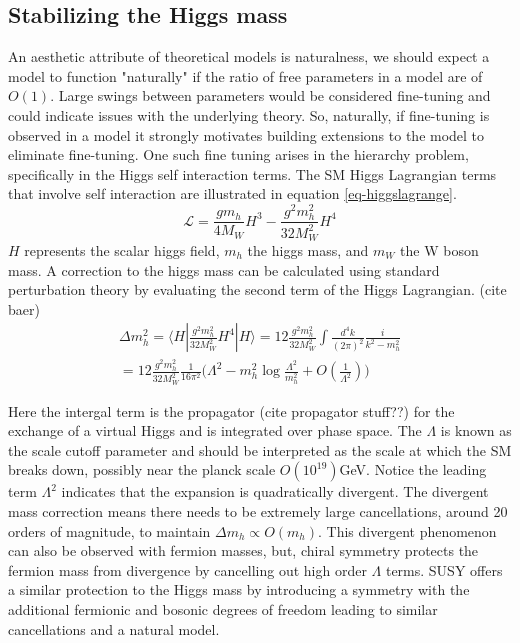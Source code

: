 \subsection{Stabilizing the Higgs mass}

An aesthetic attribute of theoretical models is naturalness, we should expect a model to function "naturally" if the ratio of free parameters in a model are of $O(1)$. Large swings between parameters would be considered fine-tuning and could indicate issues with the underlying theory. So, naturally, if fine-tuning is observed in a model it strongly motivates building extensions to the model to eliminate fine-tuning. %
One such fine tuning arises in the hierarchy problem, specifically in the Higgs self interaction terms. The SM Higgs Lagrangian terms that involve self interaction are illustrated in equation \ref{eq-higgslagrange}.
\begin{equation}
\label{eq-higgslagrange}
\mathcal{L}=\frac{gm_h}{4M_W}H^3 - \frac{g^2m_h^2}{32M_W^2}H^4
\end{equation}
$H$ represents the scalar higgs field, $m_h$ the higgs mass, and $m_W$ the W boson  mass. A correction to the higgs mass can be calculated using standard perturbation theory by evaluating the second term of the Higgs Lagrangian. (cite baer)
\begin{equation}
\begin{split}
\Delta m_h^2 = \langle H | \frac{g^2m_h^2}{32M_W^2} H^4 | H  \rangle = 12\frac{g^2m_h^2}{32M_W^2}\int \frac{d^4 k}{(2\pi)^2} \frac{i}{k^2 - m_h^2}\\
= 12\frac{g^2m_h^2}{32M_W^2} \frac{1}{16\pi^2}\big( \Lambda^2 - m_h^2\log\frac{\Lambda^2}{m_h^2} + O(\frac{1}{\Lambda^2})\big)
\end{split} 
\end{equation}
 
 Here the intergal term is the propagator (cite propagator stuff??) for the exchange of a virtual Higgs and is integrated over phase space. The $\Lambda$ is known as the scale cutoff parameter and should be interpreted as the scale at which the SM breaks down, possibly near the planck scale $O(10^{19})$GeV. Notice the leading term $\Lambda^2$ indicates that the expansion is quadratically divergent. The divergent mass correction means there needs to be extremely large cancellations, around 20 orders of magnitude, to maintain $\Delta m_h \propto O(m_h)$. This divergent phenomenon can also be observed with fermion masses, but, chiral symmetry protects the fermion mass from divergence by cancelling out high order $\Lambda$ terms. SUSY offers a similar protection to the Higgs mass by introducing a symmetry with the additional fermionic and bosonic degrees of freedom leading to similar cancellations and a natural model. 


